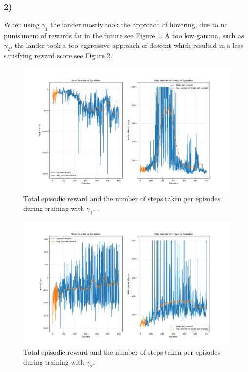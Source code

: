 \documentclass{article}
\begin{document}
\subsubsection*{2)}
When using $\gamma_1$ the lander mostly took the approach of hovering, due to no punishment of rewards far in the future see Figure \ref{fig:gamma1}. A too low gamma, such as $\gamma_2$, the lander took a too aggressive approach of descent which resulted in a less satisfying reward score see Figure \ref{fig:gamma0.2}.
\begin{figure}[H]
    \centering
    \includegraphics[width=1\textwidth]{Lab_2/problem1/images/gamma_1.png}
    \caption{\small Total episodic reward and the number of steps taken per episodes during training with $\gamma_1$. . }
    \label{fig:gamma1}
\end{figure}

\begin{figure}[H]
    \centering
    \includegraphics[width=1\textwidth]{Lab_2/problem1/images/gamma_02.png}
    \caption{\small Total episodic reward and the number of steps taken per episodes during training with $\gamma_2$. }
    \label{fig:gamma0.2}
\end{figure}
\end{document}
